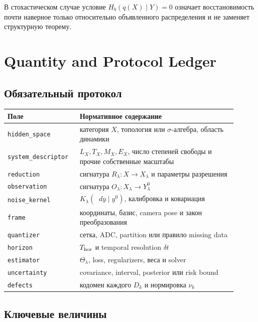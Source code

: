 \documentclass[11pt,a4paper]{article}
\theoremstyle{definition}
\theoremstyle{plain}
\theoremstyle{remark}
\newcommand{\dd}{\mathop{}\!d}
\begin{document}
В стохастическом случае условие $H_b(q(X)\mid Y)=0$ означает
восстановимость почти наверное только относительно объявленного
распределения и не заменяет структурную теорему.

\section{Quantity and Protocol Ledger}

\subsection{Обязательный протокол}

\begin{longtable}{L{0.27\linewidth}L{0.64\linewidth}}
\toprule
Поле & Нормативное содержание\\
\midrule
\endhead
\texttt{hidden\_space} & категория $X$, топология или $\sigma$-алгебра,
область динамики\\
\texttt{system\_descriptor} & $L_X,T_X,M_X,E_X$, число степеней свободы
и прочие собственные масштабы\\
\texttt{reduction} & сигнатура $R_\lambda:X\to X_\lambda$ и параметры
разрешения\\
\texttt{observation} & сигнатура $O_\lambda:X_\lambda\to Y_\lambda^0$\\
\texttt{noise\_kernel} & $K_\lambda(\dd y\mid y^0)$, калибровка и
ковариация\\
\texttt{frame} & координаты, базис, camera pose и закон преобразования\\
\texttt{quantizer} & сетка, ADC, partition или правило missing data\\
\texttt{horizon} & $T_{\rm hor}$ и temporal resolution $\delta t$\\
\texttt{estimator} & $\Theta_\lambda$, loss, regularizers, веса и solver\\
\texttt{uncertainty} & covariance, interval, posterior или risk bound\\
\texttt{defects} & кодомен каждого $D_k$ и нормировка $\nu_k$\\
\bottomrule
\end{longtable}

\subsection{Ключевые величины}
\end{document}
